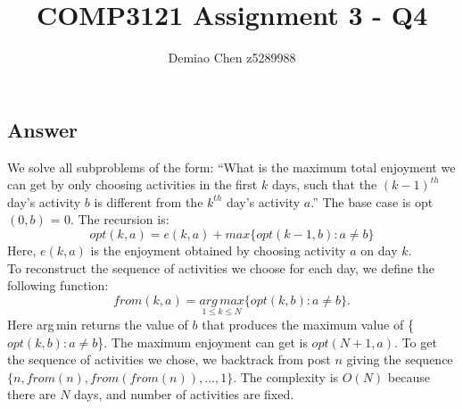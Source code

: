 \documentclass[12pt]{article}
\title{COMP3121 Assignment 3 - Q4}
\author{Demiao Chen z5289988}
\begin{document}
\maketitle
{}


\subsection*{Answer}
We solve all subproblems of the form: ``What is the maximum
total enjoyment we can get by only choosing activities in the first 
$k$ days, such that the $(k-1)^{th}$ day's activity $b$ is different 
from the $k^{th}$ day's activity $a$.'' The base case is opt$(0, b)$ = 0. 
The recursion is: 
\[
    opt(k, a) = e(k, a) + max \{ opt(k-1, b) :  a \neq  b \}    
\]
Here, $e(k, a)$ is the enjoyment obtained by choosing activity $a$ on day $k$.\\
To reconstruct the sequence of activities we choose for each day, 
we deﬁne the following function: 
\[
    from(k,a) =  \underset{1 \leq k \leq N}{arg\,max}\{ opt(k, b) :  a \neq  b \}.
\]
Here arg\,min returns the value of $b$ that produces the maximum value of \{$opt(k, b) :  a \neq  b$\}.
The maximum enjoyment can get is $opt(N+1, a)$. To get the sequence of activities we chose,
we backtrack from post $n$ giving the sequence $\{ n, from(n), from(from(n)), ..., 1 \}$.
The complexity is $O(N)$ because there are $N$ days, and number of activities are fixed.
\end{document}
